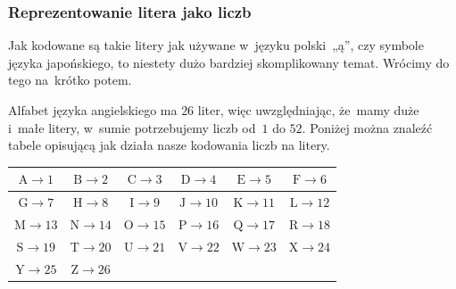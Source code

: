 \documentclass[10pt,t]{beamer}
\begin{document}
\begin{frame}
  \frametitle{Reprezentowanie litera jako liczb}


  Jak kodowane są takie litery jak używane w~języku polski~„ą”, czy symbole
  języka japońskiego, to niestety \alert{dużo} bardziej skomplikowany temat.
  Wrócimy do tego na~krótko potem.

  Alfabet języka angielskiego ma $26$ liter, więc uwzględniając,
  że~mamy duże i~małe litery, w~sumie potrzebujemy liczb od~$1$ do $52$.
  Poniżej można znaleźć tabele opisującą jak działa nasze kodowania
  liczb na litery.

  \begin{center}

    \begin{tabular}{| c | c | c | c | c | c |}
      \hline
      $\text{A} \to 1$ & $\text{B} \to 2$ & $\text{C} \to 3$
      & $\text{D} \to 4$ & $\text{E} \to 5$ & $\text{F} \to 6$ \\
      \hline
      $\text{G} \to 7$ & $\text{H} \to 8$ & $\text{I} \to 9$
      & $\text{J} \to 10$ & $\text{K} \to 11$ & $\text{L} \to 12$ \\
      \hline
      $\text{M} \to 13$ & $\text{N} \to 14$ & $\text{O} \to 15$
      & $\text{P} \to 16$ & $\text{Q} \to 17$ & $\text{R} \to 18$ \\
      \hline
      $\text{S} \to 19$ & $\text{T} \to 20$ & $\text{U} \to 21$
      & $\text{V} \to 22$ & $\text{W} \to 23$ & $\text{X} \to 24$ \\
      \hline
      $\text{Y} \to 25$ & $\text{Z} \to 26$ & & & & \\
      \hline
    \end{tabular}

  \end{center}

\end{frame}
\end{document}
